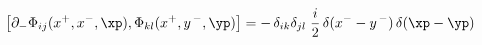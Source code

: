 \begin{equation}
    \left[ \partial_- \Phi_{ij}(x^+, x^-, \xp),
    \Phi_{kl}(x^+, y^{\,-},\yp) \right] =
    - \, \delta_{ik}  \delta_{jl} \; \frac i2 \,
    \delta(x^- - y^{\,-}) \, \delta(\xp - \yp)
\end{equation}

